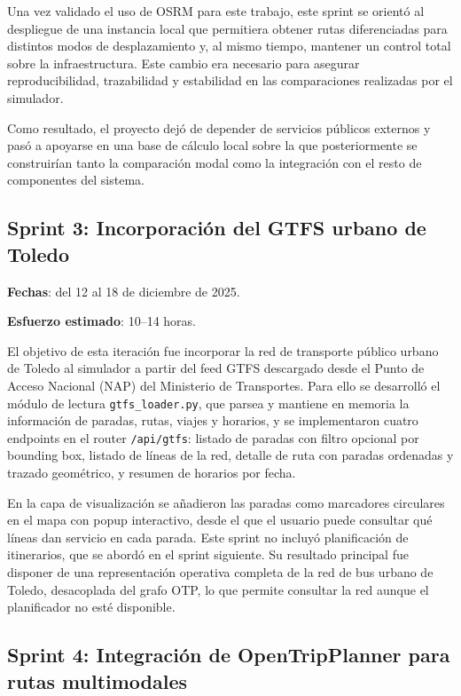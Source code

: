 Una vez validado el uso de OSRM para este trabajo, este sprint se orientó al despliegue de una instancia local que permitiera obtener rutas diferenciadas para distintos modos de desplazamiento y, al mismo tiempo, mantener un control total sobre la infraestructura. Este cambio era necesario para asegurar reproducibilidad, trazabilidad y estabilidad en las comparaciones realizadas por el simulador.

Como resultado, el proyecto dejó de depender de servicios públicos externos y pasó a apoyarse en una base de cálculo local sobre la que posteriormente se construirían tanto la comparación modal como la integración con el resto de componentes del sistema.

\subsection{Sprint 3: Incorporación del GTFS urbano de Toledo}

\textbf{Fechas}: del 12 al 18 de diciembre de 2025.

\textbf{Esfuerzo estimado}: 10--14 horas.

El objetivo de esta iteración fue incorporar la red de transporte público urbano de Toledo al simulador a partir del feed GTFS descargado desde el Punto de Acceso Nacional (NAP) del Ministerio de Transportes. Para ello se desarrolló el módulo de lectura \texttt{gtfs\_loader.py}, que parsea y mantiene en memoria la información de paradas, rutas, viajes y horarios, y se implementaron cuatro endpoints en el router \texttt{/api/gtfs}: listado de paradas con filtro opcional por bounding box, listado de líneas de la red, detalle de ruta con paradas ordenadas y trazado geométrico, y resumen de horarios por fecha.

En la capa de visualización se añadieron las paradas como marcadores circulares en el mapa con popup interactivo, desde el que el usuario puede consultar qué líneas dan servicio en cada parada. Este sprint no incluyó planificación de itinerarios, que se abordó en el sprint siguiente. Su resultado principal fue disponer de una representación operativa completa de la red de bus urbano de Toledo, desacoplada del grafo OTP, lo que permite consultar la red aunque el planificador no esté disponible.

\subsection{Sprint 4: Integración de OpenTripPlanner para rutas multimodales}

